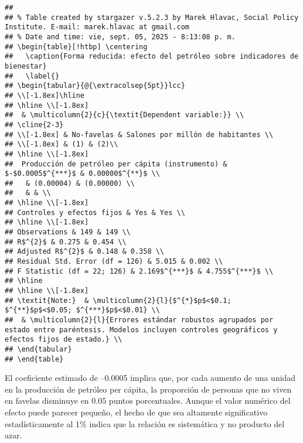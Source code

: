 \documentclass[
]{article}
\begin{document}
\begin{verbatim}
## 
## % Table created by stargazer v.5.2.3 by Marek Hlavac, Social Policy Institute. E-mail: marek.hlavac at gmail.com
## % Date and time: vie, sept. 05, 2025 - 8:13:08 p. m.
## \begin{table}[!htbp] \centering 
##   \caption{Forma reducida: efecto del petróleo sobre indicadores de bienestar} 
##   \label{} 
## \begin{tabular}{@{\extracolsep{5pt}}lcc} 
## \\[-1.8ex]\hline 
## \hline \\[-1.8ex] 
##  & \multicolumn{2}{c}{\textit{Dependent variable:}} \\ 
## \cline{2-3} 
## \\[-1.8ex] & No-favelas & Salones por millón de habitantes \\ 
## \\[-1.8ex] & (1) & (2)\\ 
## \hline \\[-1.8ex] 
##  Producción de petróleo per cápita (instrumento) & $-$0.0005$^{***}$ & 0.00000$^{**}$ \\ 
##   & (0.00004) & (0.00000) \\ 
##   & & \\ 
## \hline \\[-1.8ex] 
## Controles y efectos fijos & Yes & Yes \\ 
## \hline \\[-1.8ex] 
## Observations & 149 & 149 \\ 
## R$^{2}$ & 0.275 & 0.454 \\ 
## Adjusted R$^{2}$ & 0.148 & 0.358 \\ 
## Residual Std. Error (df = 126) & 5.015 & 0.002 \\ 
## F Statistic (df = 22; 126) & 2.169$^{***}$ & 4.755$^{***}$ \\ 
## \hline 
## \hline \\[-1.8ex] 
## \textit{Note:}  & \multicolumn{2}{l}{$^{*}$p$<$0.1; $^{**}$p$<$0.05; $^{***}$p$<$0.01} \\ 
##  & \multicolumn{2}{l}{Errores estándar robustos agrupados por estado entre paréntesis. Modelos incluyen controles geográficos y efectos fijos de estado.} \\ 
## \end{tabular} 
## \end{table}
\end{verbatim}

El coeficiente estimado de --0.0005 implica que, por cada aumento de una
unidad en la producción de petróleo per cápita, la proporción de
personas que no viven en favelas disminuye en 0.05 puntos porcentuales.
Aunque el valor numérico del efecto puede parecer pequeño, el hecho de
que sea altamente significativo estadísticamente al 1\% indica que la
relación es sistemática y no producto del azar.
\end{document}
